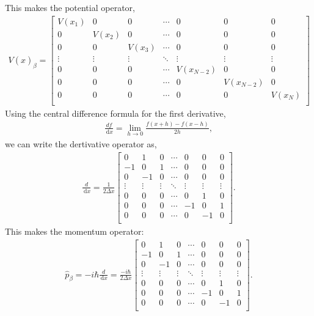 \documentclass[10pt]{article}
\newcommand{\1}{\mathbf 1}
\begin{document}
This makes the potential operator,
\begin{align}
V(\hat x)_\beta
=
\begin{bmatrix}
V(x_1) & 0 & 0  & \cdots &0 & 0 & 0 \\
0 & V(x_2) & 0 & \cdots &0 & 0 & 0\\
0 & 0 & V(x_3) & \cdots & 0 & 0 & 0\\
\vdots & \vdots & \vdots & \ddots & \vdots & \vdots & \vdots\\
0 & 0 & 0 & \cdots & V(x_{N-2}) & 0&0\\
0 & 0 & 0 & \cdots & 0 & V(x_{N-2}) & 0\\
0 & 0 & 0 & \cdots & 0 & 0& V(x_{N})\\
\end{bmatrix}
\end{align}
Using the central difference formula for the first derivative,
\begin{align}
\frac{df}{\,\mathrm{d} x}
=
\lim_{h\to 0}
\frac{f(x+h) -f(x-h)}{2h},
\end{align}
we can write the dertivative operator as,
\begin{align}
\frac{d}{\,\mathrm{d} x}
=
\frac{1}{2\Delta x}
\begin{bmatrix}
0 & 1 & 0  & \cdots &0 & 0 & 0 \\
-1 & 0 & 1 & \cdots &0 & 0 & 0\\
0 & -1 & 0 & \cdots & 0 & 0 & 0\\
\vdots & \vdots & \vdots & \ddots & \vdots & \vdots & \vdots\\
0 & 0 & 0 & \cdots & 0 & 1 & 0\\
0 & 0 & 0 & \cdots & -1 & 0 & 1\\
0 & 0 & 0 & \cdots & 0 & -1 & 0\\
\end{bmatrix}.
\end{align}
This makes the momentum operator:
\begin{align}
\hat p_\beta
=
- i \hbar \frac{d}{\,\mathrm{d} x}
=
\frac{-i\hbar}{2\Delta x}
\begin{bmatrix}
0 & 1 & 0  & \cdots &0 & 0 & 0 \\
-1 & 0 & 1 & \cdots &0 & 0 & 0\\
0 & -1 & 0 & \cdots & 0 & 0 & 0\\
\vdots & \vdots & \vdots & \ddots & \vdots & \vdots & \vdots\\
0 & 0 & 0 & \cdots & 0 & 1 & 0\\
0 & 0 & 0 & \cdots & -1 & 0 & 1\\
0 & 0 & 0 & \cdots & 0 & -1 & 0\\
\end{bmatrix}.
\end{align}
\end{document}
